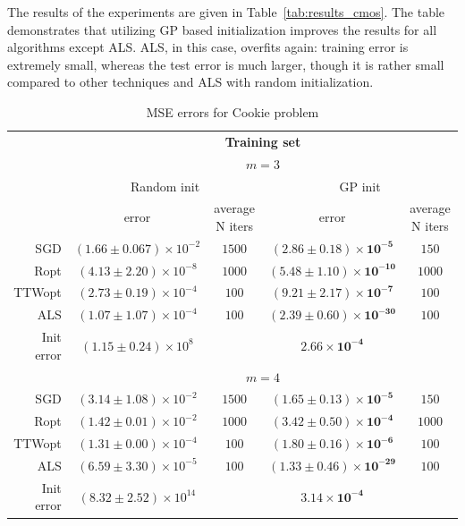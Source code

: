 The results of the experiments are given in Table~\ref{tab:results_cmos}. The table demonstrates that utilizing GP based initialization improves the results for all algorithms except ALS. ALS, in this case, overfits again: training error is extremely small, whereas the test error is much larger, though it is rather small compared to other techniques and ALS with random initialization.

\begin{table}[]
    \centering
    \caption{MSE errors for Cookie problem}
    \small
    \label{tab:results_cookie}
    \begin{tabular}{r|cc|cc|}
         & \multicolumn{4}{c|}{\textbf{Training set}} \\
         & \multicolumn{4}{c|}{$m = 3$} \\
        \hline
          & \multicolumn{2}{c|}{Random init} & \multicolumn{2}{c|}{GP init} \\
          & \multirow{2}{*}{error} & \multirow{2}{4em}{average N iters} & \multirow{2}{*}{error} &
          \multirow{2}{4em}{average N iters} \\
          & & & & \\
        \hline
        SGD & $(1.66 \pm 0.067) \times 10^{-2}$ & $1500$ &
        $\mathbf{(2.86 \pm 0.18) \times 10^{-5}}$ & $150$ \\
        Ropt & $(4.13 \pm 2.20) \times 10^{-8}$ & $1000$ &
        $\mathbf{(5.48 \pm 1.10) \times 10^{-10}}$ & $1000$ \\
        TTWopt & $(2.73 \pm 0.19) \times 10^{-4}$ & $100$ &
        $\mathbf{(9.21 \pm 2.17) \times 10^{-7}}$ & $100$ \\
        ALS & $(1.07 \pm 1.07) \times 10^{-4}$ & $100$ &
        $\mathbf{(2.39 \pm 0.60) \times 10^{-30}}$ & $100$ \\
        \hline
        Init error & $(1.15 \pm 0.24) \times 10^{8}$ &  &
        $\mathbf{2.66 \times 10^{-4}}$ &  \\
        \hline

        & \multicolumn{4}{c|}{$m = 4$} \\

        \hline
        SGD &
        $(3.14 \pm 1.08) \times 10^{-2}$ & $1500$ &
        $\mathbf{(1.65 \pm 0.13) \times 10^{-5}}$ & $150$ \\
        Ropt &
        $(1.42 \pm 0.01) \times 10^{-2}$ & $1000$ &
        $\mathbf{(3.42 \pm 0.50) \times 10^{-4}}$ & $1000$ \\
        TTWopt &
        $(1.31 \pm 0.00) \times 10^{-4}$ & $100$ &
        $\mathbf{(1.80 \pm 0.16) \times 10^{-6}}$ & $100$ \\
        ALS &
        $(6.59 \pm 3.30) \times 10^{-5}$ & $100$ &
        $\mathbf{(1.33 \pm 0.46) \times 10^{-29}}$ & $100$ \\
        \hline
        Init error & $(8.32 \pm 2.52) \times 10^{14}$ &  &
        $\mathbf{3.14 \times 10^{-4}}$ &  \\
        \hline


\end{tabular}
\end{table}
